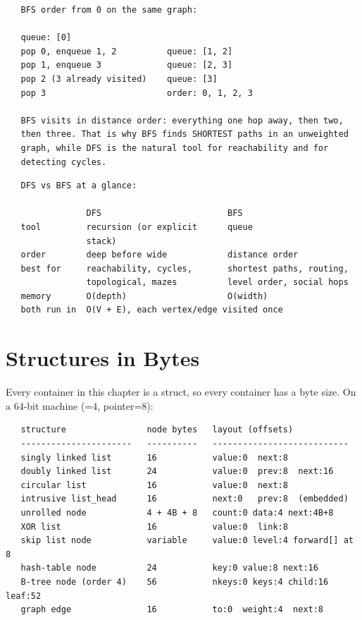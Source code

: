 \begin{verbatim}
   BFS order from 0 on the same graph:

   queue: [0]
   pop 0, enqueue 1, 2          queue: [1, 2]
   pop 1, enqueue 3             queue: [2, 3]
   pop 2 (3 already visited)    queue: [3]
   pop 3                        order: 0, 1, 2, 3

   BFS visits in distance order: everything one hop away, then two,
   then three. That is why BFS finds SHORTEST paths in an unweighted
   graph, while DFS is the natural tool for reachability and for
   detecting cycles.
\end{verbatim}

\begin{verbatim}
   DFS vs BFS at a glance:

                DFS                         BFS
   tool         recursion (or explicit      queue
                stack)
   order        deep before wide            distance order
   best for     reachability, cycles,       shortest paths, routing,
                topological, mazes          level order, social hops
   memory       O(depth)                    O(width)
   both run in  O(V + E), each vertex/edge visited once
\end{verbatim}

\section{Structures in Bytes}

Every container in this chapter is a struct, so every container has a
byte size. On a 64-bit machine (=4, pointer=8):

\begin{verbatim}
   structure                node bytes   layout (offsets)
   ----------------------   ----------   ---------------------------
   singly linked list       16           value:0  next:8
   doubly linked list       24           value:0  prev:8  next:16
   circular list            16           value:0  next:8
   intrusive list_head      16           next:0   prev:8  (embedded)
   unrolled node            4 + 4B + 8   count:0 data:4 next:4B+8
   XOR list                 16           value:0  link:8
   skip list node           variable     value:0 level:4 forward[] at 8
   hash-table node          24           key:0 value:8 next:16
   B-tree node (order 4)    56           nkeys:0 keys:4 child:16 leaf:52
   graph edge               16           to:0  weight:4  next:8
\end{verbatim}

